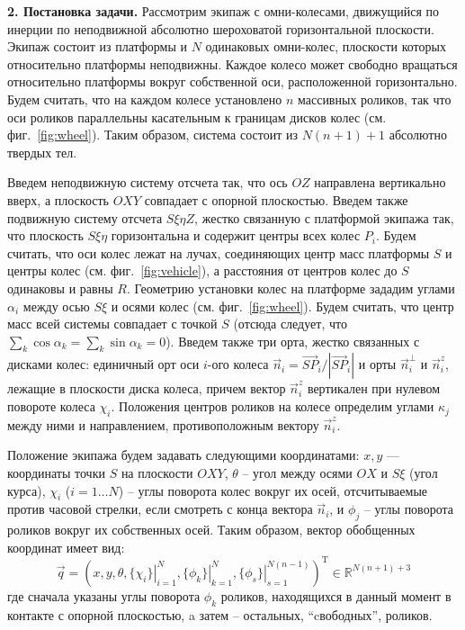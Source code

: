 {\bf 2. Постановка задачи.}
Рассмотрим экипаж с омни-колесами, движущийся по инерции по неподвижной абсолютно шероховатой горизонтальной плоскости. Экипаж состоит из платформы и $N$ одинаковых омни-колес, плоскости которых относительно платформы неподвижны. Каждое колесо может свободно вращаться относительно платформы вокруг собственной оси, расположенной горизонтально. Будем считать, что на каждом колесе установлено $n$ массивных роликов, так что оси роликов параллельны касательным к границам дисков колес (см. фиг.~\ref{fig:wheel}). Таким образом, система состоит из $N(n+1) + 1$ абсолютно твердых тел. 



Введем неподвижную систему отсчета так, что ось $OZ$ направлена вертикально вверх, а плоскость $OXY$ совпадает с опорной плоскостью.
Введем также подвижную систему отсчета $S\xi\eta Z$, жестко связанную с платформой экипажа так, что плоскость $S\xi\eta$ горизонтальна и содержит центры всех колес $P_i$. Будем считать, что оси колес лежат на лучах, соединяющих центр масс платформы $S$ и центры колес (см. фиг.~\ref{fig:vehicle}), а расстояния от центров колес до $S$ одинаковы и равны $R$. Геометрию установки колес на платформе зададим углами $\alpha_i$ между осью $S\xi$ и осями колес 
(см. фиг.~\ref{fig:wheel}). Будем считать, что центр масс всей системы совпадает с точкой $S$ (отсюда следует, что $\sum_k \cos\alpha_k = \sum_k\sin\alpha_k = 0$). Введем также три орта, жестко связанных с дисками колес: единичный орт оси $i$-ого колеса $\vec{n}_i = \vec{SP}_i/|\vec{SP}_i|$ и орты $\vec{n}_i^\perp$ и $\vec{n}_i^z$, лежащие в плоскости диска колеса, причем вектор $\vec{n}_i^z$ вертикален при нулевом повороте колеса $\chi_i$. Положения центров роликов на колесе определим углами $\kappa_j$ между ними и направлением, противоположным вектору $\vec{n}_i^z$. 

Положение экипажа будем задавать следующими координатами:
$x, y$ --- координаты точки $S$ на плоскости $OXY$, $\theta$ -- угол между осями $OX$ и $S\xi$ (угол курса),
$\chi_i$ ($i = 1\dots N$) -- углы поворота колес вокруг их осей, отсчитываемые против часовой стрелки, если смотреть с конца вектора $\vec{n}_i$, и $\phi_j$ -- углы поворота роликов вокруг их собственных осей.
Таким образом, вектор обобщенных координат имеет вид:
$$\vec{q} = (
    x, y, \theta,
    \left.\{\chi_i\}\right|_{i=1}^N ,
    \left.\{\phi_k\}\right|_{k=1}^N,
    \left.\{\phi_s\}\right|_{s=1}^{N(n - 1)}
)^{\mathop{T}}\in\mathbb{R}^{N(n+1) + 3}$$ 
где сначала указаны углы поворота $\phi_k$ роликов, находящихся в данный момент в контакте с опорной плоскостью, a затем -- остальных, ``cвободных'', роликов.

